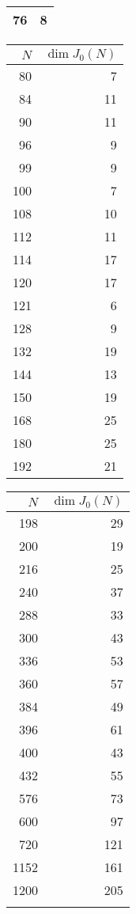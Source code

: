\begin{table}
\begin{tabular}{rr}
        76 & 8 \\
        \bottomrule
    \end{tabular}
    \begin{tabular}{rr}
        \toprule
        $N$ & $\dim J_0(N)$ \\
        \midrule
        80 & 7 \\
        84 & 11 \\
        90 & 11 \\
        96 & 9 \\
        99 & 9 \\
        100 & 7 \\
        108 & 10 \\
        112 & 11 \\
        114 & 17 \\
        120 & 17 \\
        121 & 6 \\
        128 & 9 \\
        132 & 19 \\
        144 & 13 \\
        150 & 19 \\
        168 & 25 \\
        180 & 25 \\
        192 & 21 \\
        \bottomrule
    \end{tabular}
    \begin{tabular}{rr}
        \toprule
        $N$ & $\dim J_0(N)$ \\
        \midrule
        198 & 29 \\
        200 & 19 \\
        216 & 25 \\
        240 & 37 \\
        288 & 33 \\
        300 & 43 \\
        336 & 53 \\
        360 & 57 \\
        384 & 49 \\
        396 & 61 \\
        400 & 43 \\
        432 & 55 \\
        576 & 73 \\
        600 & 97 \\
        720 & 121 \\
        1152 & 161 \\
        1200 & 205 \\
            & \\
        \bottomrule
    \end{tabular}
\end{table}
